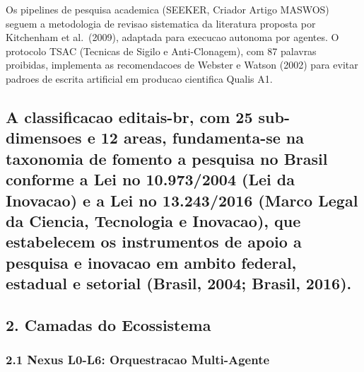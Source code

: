 \documentclass[
  12pt,
]{article}
\begin{document}
Os pipelines de pesquisa academica (SEEKER, Criador Artigo MASWOS)
seguem a metodologia de revisao sistematica da literatura proposta por
Kitchenham et al.~(2009), adaptada para execucao autonoma por agentes. O
protocolo TSAC (Tecnicas de Sigilo e Anti-Clonagem), com 87 palavras
proibidas, implementa as recomendacoes de Webster e Watson (2002) para
evitar padroes de escrita artificial em producao cientifica Qualis A1.

\subsection{A classificacao editais-br, com 25 sub-dimensoes e 12 areas,
fundamenta-se na taxonomia de fomento a pesquisa no Brasil conforme a
Lei no 10.973/2004 (Lei da Inovacao) e a Lei no 13.243/2016 (Marco Legal
da Ciencia, Tecnologia e Inovacao), que estabelecem os instrumentos de
apoio a pesquisa e inovacao em ambito federal, estadual e setorial
(Brasil, 2004; Brasil,
2016).}\label{a-classificacao-editais-br-com-25-sub-dimensoes-e-12-areas-fundamenta-se-na-taxonomia-de-fomento-a-pesquisa-no-brasil-conforme-a-lei-no-10.9732004-lei-da-inovacao-e-a-lei-no-13.2432016-marco-legal-da-ciencia-tecnologia-e-inovacao-que-estabelecem-os-instrumentos-de-apoio-a-pesquisa-e-inovacao-em-ambito-federal-estadual-e-setorial-brasil-2004-brasil-2016.}

\subsection{2. Camadas do Ecossistema}\label{camadas-do-ecossistema}

\subsubsection{2.1 Nexus L0-L6: Orquestracao
Multi-Agente}\label{nexus-l0-l6-orquestracao-multi-agente}
\end{document}

